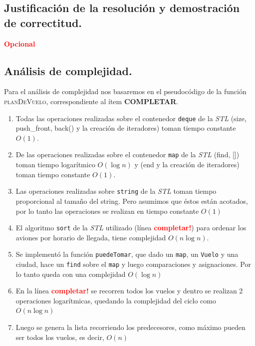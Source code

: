 \newpage
\subsection{Justificación de la resolución y demostración de correctitud.}

\vspace*{0.3cm}

\textcolor{red}{\textbf{Opcional}}



\newpage
\subsection{Análisis de complejidad.}

\vspace*{0.3cm}

Para el análisis de complejidad nos basaremos en el pseudocódigo de la función
\textsc{planDeVuelo}, correspondiente al ítem \textbf{COMPLETAR}.

\begin{enumerate}
  \item Todas las operaciones realizadas sobre el contenedor \verb|deque| de la
    \textit{STL} (size, push_front, back() y la creación de iteradores)
    toman tiempo constante $O(1)$.
  \item De las operaciones realizadas sobre el contenedor \verb|map| de la
    \textit{STL} (find, []) toman tiempo logarítmico $O(\log n)$ y (end y la creación de iteradores)
    toman tiempo constante $O(1)$.
  \item Las operaciones realizadas sobre \verb|string| de la \textit{STL} toman
    tiempo proporcional al tamaño del string. Pero asumimos que éstos están
    acotados, por lo tanto las operaciones se realizan en tiempo constante
    $O(1)$
  \item El algoritmo \verb|sort| de la \textit{STL} utilizado (línea \textcolor{red}{\textbf{completar!}}) para ordenar los aviones
    por horario de llegada, tiene complejidad $O(n \log n)$.
  \item Se implementó la función \verb|puedeTomar|, que dado un \verb|map|, un \verb|Vuelo| y
    una ciudad, hace un \verb|find| sobre el \verb|map| y luego comparaciones y asignaciones.
    Por lo tanto queda con una complejidad $O(\log n)$
  \item En la línea \textcolor{red}{\textbf{completar!}} se recorren todos los vuelos
    y dentro se realizan 2 operaciones logarítmicas, quedando la complejidad del
    ciclo como $O(n \log n)$
  \item Luego se genera la lista recorriendo los predecesores, como máximo pueden ser
    todos los vuelos, es decir, $O(n)$
\end{enumerate}


